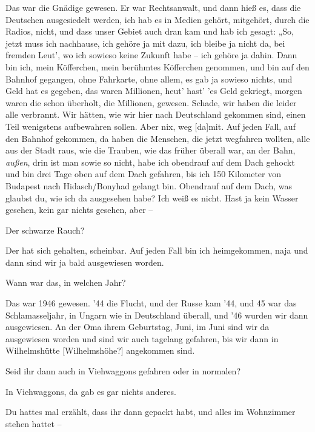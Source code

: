 \documentclass[ngerman,]{article}
\providecommand{\tightlist}{%
  \setlength{\itemsep}{0pt}\setlength{\parskip}{0pt}}
\begin{document}
\begin{multicols}{3}
\begin{description}
\tightlist
\item[Käthe]
Das war die Gnädige gewesen. Er war Rechtsanwalt, und dann hieß es, dass
die Deutschen ausgesiedelt werden, ich hab es in Medien gehört,
mitgehört, durch die Radios, nicht, und dass unser Gebiet auch dran kam
und hab ich gesagt: „So, jetzt muss ich nachhause, ich gehöre ja mit
dazu, ich bleibe ja nicht da, bei fremden Leut', wo ich sowieso keine
Zukunft habe – ich gehöre ja dahin. Dann bin ich, mein Köfferchen, mein
berühmtes Köfferchen genommen, und bin auf den Bahnhof gegangen, ohne
Fahrkarte, ohne allem, es gab ja sowieso nichts, und Geld hat es
gegeben, das waren Millionen, heut' hast' 'es Geld gekriegt, morgen
waren die schon überholt, die Millionen, gewesen. Schade, wir haben die
leider alle verbrannt. Wir hätten, wie wir hier nach Deutschland
gekommen sind, einen Teil wenigstens aufbewahren sollen. Aber nix, weg
{[}da{]}mit. Auf jeden Fall, auf den Bahnhof gekommen, da haben die
Menschen, die jetzt wegfahren wollten, alle aus der Stadt raus, wie die
Trauben, wie das früher überall war, an der Bahn, \emph{außen}, drin ist
man sowie so nicht, habe ich obendrauf auf dem Dach gehockt und bin drei
Tage oben auf dem Dach gefahren, bis ich 150 Kilometer von Budapest nach
Hidasch/Bonyhad gelangt bin. Obendrauf auf dem Dach, was glaubst du, wie
ich da ausgesehen habe? Ich weiß es nicht. Hast ja kein Wasser gesehen,
kein gar nichts gesehen, aber –
\item[Ruth]
Der schwarze Rauch?
\item[Käthe]
Der hat sich gehalten, scheinbar. Auf jeden Fall bin ich heimgekommen,
naja und dann sind wir ja bald ausgewiesen worden.
\item[Ruth]
Wann war das, in welchen Jahr?
\item[Käthe]
Das war 1946 gewesen. '44 die Flucht, und der Russe kam '44, und 45 war
das Schlamasseljahr, in Ungarn wie in Deutschland überall, und '46
wurden wir dann ausgewiesen. An der Oma ihrem Geburtstag, Juni, im Juni
sind wir da ausgewiesen worden und sind wir auch tagelang gefahren, bis
wir dann in Wilhelmshütte {[}Wilhelmshöhe?{]} angekommen sind.
\item[Ruth]
Seid ihr dann auch in Viehwaggons gefahren oder in normalen?
\item[Käthe]
In Viehwaggons, da gab es gar nichts anderes.
\item[Ruth]
Du hattes mal erzählt, dass ihr dann gepackt habt, und alles im
Wohnzimmer stehen hattet –
\item[Käthe]

\end{description}
\end{multicols}
\end{document}
